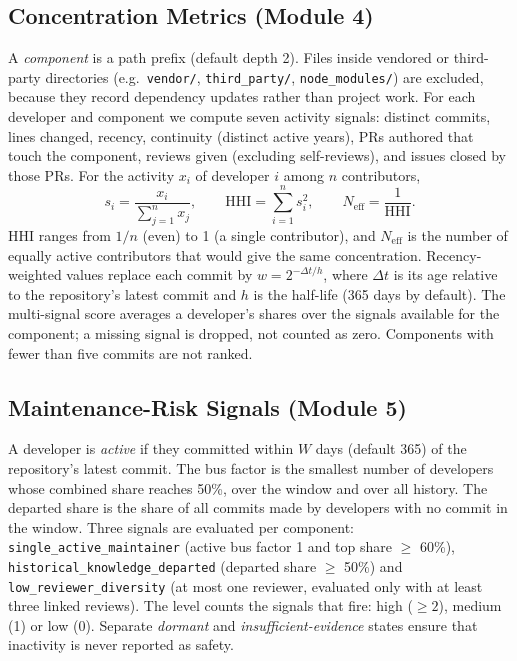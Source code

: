 \documentclass[conference]{IEEEtran}
\newcommand{\code}[1]{\texttt{\small #1}}
\begin{document}
\subsection{Concentration Metrics (Module 4)}
A \emph{component} is a path prefix (default depth 2). Files inside vendored or third-party directories (e.g.\ \code{vendor/}, \code{third\_party/}, \code{node\_modules/}) are excluded, because they record dependency updates rather than project work. For each developer and component we compute seven activity signals: distinct commits, lines changed, recency, continuity (distinct active years), PRs authored that touch the component, reviews given (excluding self-reviews), and issues closed by those PRs. For the activity $x_i$ of developer $i$ among $n$ contributors,
\begin{equation}
s_i = \frac{x_i}{\sum_{j=1}^{n} x_j},\qquad
\mathrm{HHI} = \sum_{i=1}^{n} s_i^2,\qquad
N_{\mathrm{eff}} = \frac{1}{\mathrm{HHI}}.
\label{eq:hhi}
\end{equation}
HHI ranges from $1/n$ (even) to 1 (a single contributor), and $N_{\mathrm{eff}}$ is the number of equally active contributors that would give the same concentration. Recency-weighted values replace each commit by $w = 2^{-\Delta t/h}$, where $\Delta t$ is its age relative to the repository's latest commit and $h$ is the half-life (365 days by default). The multi-signal score averages a developer's shares over the signals available for the component; a missing signal is dropped, not counted as zero. Components with fewer than five commits are not ranked.

\subsection{Maintenance-Risk Signals (Module 5)}
A developer is \emph{active} if they committed within $W$ days (default 365) of the repository's latest commit. The bus factor is the smallest number of developers whose combined share reaches 50\%, over the window and over all history. The departed share is the share of all commits made by developers with no commit in the window. Three signals are evaluated per component: \code{single\_active\_maintainer} (active bus factor 1 and top share $\geq$ 60\%), \code{historical\_knowledge\_departed} (departed share $\geq$ 50\%) and \code{low\_reviewer\_diversity} (at most one reviewer, evaluated only with at least three linked reviews). The level counts the signals that fire: high ($\geq 2$), medium (1) or low (0). Separate \emph{dormant} and \emph{insufficient-evidence} states ensure that inactivity is never reported as safety.
\end{document}
